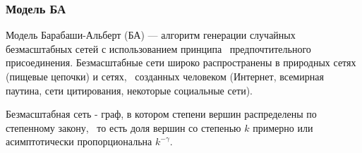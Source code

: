 \frametitle{Модель БА} 


\begin{rdefinition}    
    Модель Барабаши-Альберт (БА) — алгоритм генерации случайных безмасштабных сетей с использованием принципа \
    предпочтительного присоединения. Безмасштабные сети широко распространены в природных сетях (пищевые цепочки) и сетях, \
    созданных человеком (Интернет, всемирная паутина, сети цитирования, некоторые социальные сети).
\end{rdefinition}

\begin{rdefinition}  
    Безмасштабная сеть - граф, в котором степени вершин распределены по степенному закону, \
     то есть доля вершин со степенью $k$ примерно или асимптотически пропорциональна $k^{-\gamma}$.
\end{rdefinition}
